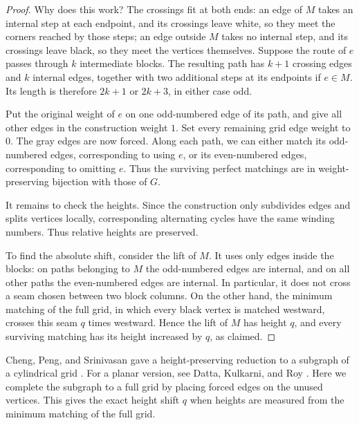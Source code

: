 \documentclass[11pt]{article}
\theoremstyle{definition}
\theoremstyle{remark}
\begin{document}
\begin{proof}
Why does this work? The crossings fit at both ends: an edge of $M$ takes an
internal step at each endpoint, and its crossings leave
white, so they meet the corners reached by those steps;
an edge outside $M$ takes no internal step, and its
crossings leave black, so they meet the vertices themselves. Suppose the route of $e$
passes through $k$ intermediate blocks.
The resulting path has $k+1$ crossing edges
and $k$ internal edges, together with two
additional steps at its endpoints if $e\in M$.
Its length is therefore $2k+1$ or $2k+3$,
in either case odd.

Put the original weight of $e$ on one odd-numbered
edge of its path, and give all other edges in
the construction weight $1$. Set every remaining
grid edge weight to $0$. The gray edges are now
forced. Along each path, we can either match its
odd-numbered edges, corresponding to using $e$,
or its even-numbered edges, corresponding to
omitting $e$. Thus the surviving perfect matchings
are in weight-preserving bijection with those
of $G$.

It remains to check the heights. Since the
construction only subdivides edges and splits
vertices locally, corresponding alternating
cycles have the same winding numbers. Thus
relative heights are preserved.

To find the absolute shift, consider the lift
of $M$. It uses only edges inside the blocks:
on paths belonging to $M$ the odd-numbered
edges are internal, and on all other paths
the even-numbered edges are internal.
In particular, it does not cross a seam
chosen between two block columns. On the other
hand, the minimum matching of the full grid,
in which every black vertex is matched westward,
crosses this seam $q$ times westward. Hence
the lift of $M$ has height $q$, and every
surviving matching has its height increased
by $q$, as claimed.
\end{proof}


Cheng, Peng, and Srinivasan gave a height-preserving
reduction to a subgraph of a cylindrical grid
\cite[Lemma~3.1]{CPS}. For a planar version, see
Datta, Kulkarni, and Roy \cite[Lemma~2.9]{DKR}.
Here we complete the subgraph to a full grid by placing
forced edges on the unused vertices. This gives the exact
height shift $q$ when heights are measured from the
minimum matching of the full grid.
\end{document}
